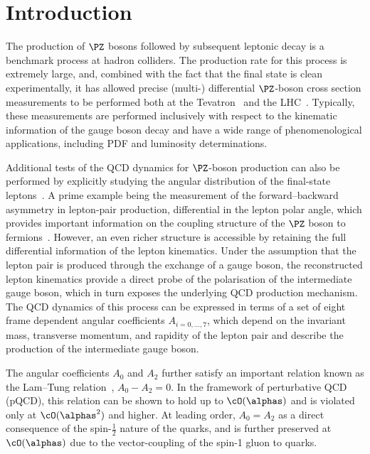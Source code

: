 
\section{Introduction} 
\label{sec1}

The production of $\PZ$ bosons followed by subsequent leptonic decay is a benchmark process at hadron colliders.
%
The production rate for this process is extremely
large, and, combined with the fact that the final state is
clean experimentally, it has allowed precise
(multi-) differential $\PZ$-boson cross section measurements 
to be performed both at the Tevatron~\cite{Aaltonen:2010zza,Abazov:2007jy} 
and the LHC~\cite{Aad:2014xaa,Khachatryan:2015oaa,Chatrchyan:2011wt,Aad:2015auj,Aaij:2015gna,Aaij:2015zlq,Aaij:2016mgv}.
Typically, these measurements are performed inclusively
with respect to the kinematic information of the gauge boson decay 
and have a wide range of phenomenological applications, including PDF and luminosity determinations.

Additional tests of the QCD dynamics for $\PZ$-boson production can also be performed by explicitly studying the angular distribution of the final-state leptons~\cite{Collins:1977iv,Lam:1978pu,Lam:1978zr,Lam:1980uc,Mirkes:1992hu,Mirkes:1994eb,Mirkes:1994dp}.
%
A prime example being the measurement of the forward--backward asymmetry
in lepton-pair production, differential in the lepton polar angle,
which provides important information on the coupling structure of the $\PZ$ boson to fermions~\cite{Chatrchyan:2011ya,
Aaltonen:2014loa,Abazov:2014jti,Aad:2015uau,Aaij:2015lka}.
%
However, an even richer structure is accessible by retaining the full 
differential information of the lepton kinematics. Under the assumption that the 
lepton pair is produced through the exchange of a gauge boson, the reconstructed 
lepton kinematics provide a direct probe of the polarisation of the intermediate gauge boson, 
which in turn exposes the underlying QCD production mechanism.
%
The QCD dynamics of this process can be expressed in terms of a set of eight frame dependent
angular coefficients $A_{i=0,\ldots,7}$, which depend on the 
invariant mass, transverse momentum, and rapidity of the lepton pair
and describe the production of the
intermediate gauge boson. 

The angular coefficients $A_0$ and $A_2$ further satisfy an important relation known 
as the Lam--Tung relation~\cite{Lam:1978pu,Lam:1978zr,Lam:1980uc}, $A_0-A_2=0$.
%
In the framework of perturbative QCD (pQCD), this relation can be shown to hold up to $\cO(\alphas)$ 
and is violated only at $\cO(\alphas^2)$ and higher.
%
At leading order, $A_0=A_2$ as a direct consequence of the spin-$\tfrac{1}{2}$ nature of the quarks,
and is further preserved at $\cO(\alphas)$ due to the vector-coupling of the spin-1 gluon to quarks.


